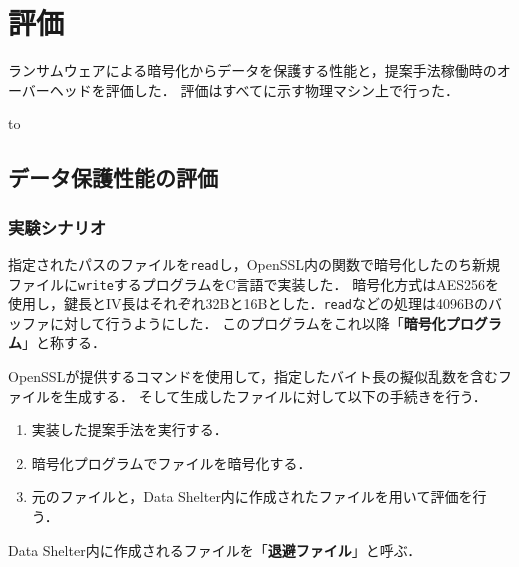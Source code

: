 \chapter{評価}
\label{chap:eval}
ランサムウェアによる暗号化からデータを保護する性能と，提案手法稼働時のオーバーヘッドを評価した．
評価はすべてに示す物理マシン上で行った．
\begin{table}[t]
  \caption{Environment of the physical machine used for the evaluation.}
  \label{tab:experiment-machine-kashiwa}
  \hbox to
\end{table}

\section{データ保護性能の評価}
\subsection{実験シナリオ}
指定されたパスのファイルを\texttt{read}し，OpenSSL内の関数で暗号化したのち新規ファイルに\texttt{write}するプログラムをC言語で実装した．
暗号化方式はAES256を使用し，鍵長とIV長はそれぞれ32Bと16Bとした．\texttt{read}などの処理は4096Bのバッファに対して行うようにした．
このプログラムをこれ以降「\textbf{暗号化プログラム}」と称する．

OpenSSLが提供するコマンドを使用して，指定したバイト長の擬似乱数を含むファイルを生成する．
そして生成したファイルに対して以下の手続きを行う．
\begin{enumerate}
  \item 実装した提案手法を実行する．
  \item 暗号化プログラムでファイルを暗号化する．
  \item 元のファイルと，Data Shelter内に作成されたファイルを用いて評価を行う．
\end{enumerate}
Data Shelter内に作成されるファイルを「\textbf{退避ファイル}」と呼ぶ．

